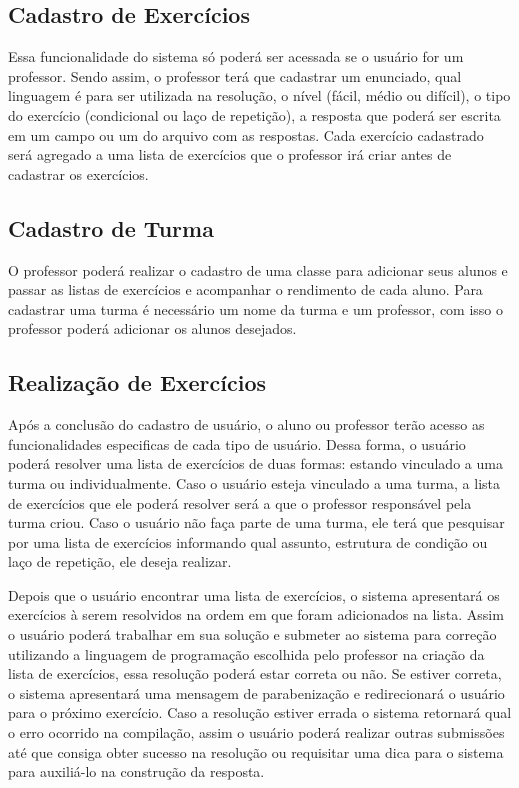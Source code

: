 \subsection{Cadastro de Exercícios}

Essa funcionalidade do sistema só poderá ser acessada se o usuário for um professor. Sendo assim, o professor terá que cadastrar um enunciado, qual linguagem é para ser utilizada na resolução, o nível (fácil, médio ou difícil), o tipo do exercício (condicional ou laço de repetição), a resposta que poderá ser escrita em um campo ou um  do arquivo com as respostas. Cada exercício cadastrado será agregado a uma lista de exercícios que o professor irá criar antes de cadastrar os exercícios.



\subsection{Cadastro de Turma}

O professor poderá realizar o cadastro de uma classe para adicionar seus alunos e passar as listas de exercícios e acompanhar o rendimento de cada aluno. Para cadastrar uma turma é necessário um nome da turma e um professor, com isso o professor poderá adicionar os alunos desejados.

\subsection{Realização de Exercícios}

Após a conclusão do cadastro de usuário, o aluno ou professor terão acesso as funcionalidades especificas de cada tipo de usuário. Dessa forma, o usuário poderá resolver uma lista de exercícios de duas formas: estando vinculado a uma turma ou individualmente. Caso o usuário esteja vinculado a uma turma, a lista de exercícios que ele poderá resolver será a que o professor responsável pela turma criou. Caso o usuário não faça parte de uma turma, ele terá que pesquisar por uma lista de exercícios informando qual assunto, estrutura de condição ou laço de repetição, ele deseja realizar. 

Depois que o usuário encontrar uma lista de exercícios, o sistema apresentará os exercícios à serem resolvidos na ordem em que foram adicionados na lista. Assim o usuário poderá trabalhar em sua solução e submeter ao sistema para correção utilizando a linguagem de programação escolhida pelo professor na criação da lista de exercícios, essa resolução poderá estar correta ou não. Se estiver correta, o sistema apresentará uma mensagem de parabenização e redirecionará o usuário para o próximo exercício. Caso a resolução estiver errada o sistema retornará qual o erro ocorrido na compilação, assim o usuário poderá realizar outras submissões até que consiga obter sucesso na resolução ou requisitar uma dica para o sistema para auxiliá-lo na construção da resposta. 

